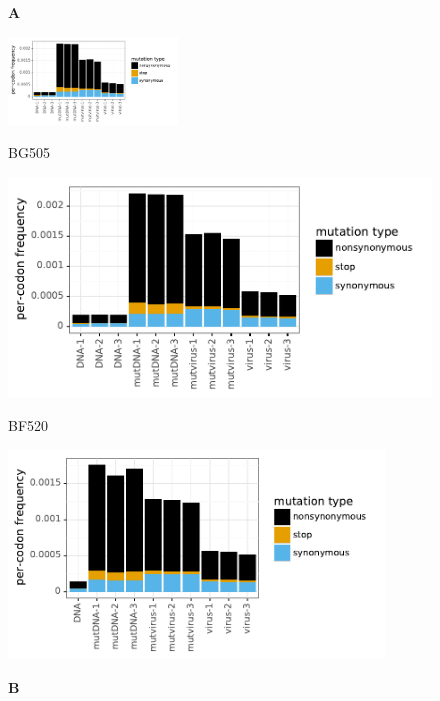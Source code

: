 \documentclass[9pt]{elife}
\begin{document}
\begin{figure}
\begin{minipage}[t]{0.34\textwidth}
{\bf \Large A} \\ 
\centerline{{\includegraphics[clip=true, trim=4.3in 1.4in 0in 0.48in, width=0.4\textwidth]{figures/BG505_avgmutfreqs.pdf}}} 
\centerline{\small BG505}
\includegraphics[clip=true, trim=0in 0in 1.7in 0in, width=\textwidth]{figures/BG505_avgmutfreqs.pdf}
\centerline{\small BF520}
\includegraphics[clip=true, trim=0in 0in 1.7in 0in, width=0.89\textwidth]{figures/BF520_avgmutfreqs.pdf}
\end{minipage}
\begin{minipage}[t]{0.01\textwidth}
\end{minipage}
\begin{minipage}[t]{0.65\textwidth}
{\bf \Large B} \\

\end{minipage}
\end{figure}
\end{document}
